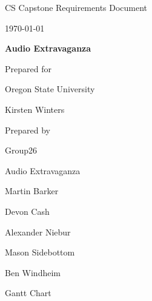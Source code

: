 \documentclass[onecolumn, draftclsnofoot,10pt, compsoc]{IEEEtran}
\def \CapstoneTeamName{Audio Extravaganza}
\def \CapstoneTeamNumber{26}
\def \GroupMemberOne{Martin Barker}
\def \GroupMemberTwo{Devon Cash}
\def \GroupMemberThree{Alexander Niebur}
\def \GroupMemberFour{Mason Sidebottom}
\def \GroupMemberFive{Ben Windheim}
\def \CapstoneProjectName{Audio Extravaganza}
\def \CapstoneSponsorCompany{Oregon State University}
\def \CapstoneSponsorPerson{Kirsten Winters}
\def \DocType{		
				Requirements Document
				}
\newcommand{\NameSigPair}[1]{\par
\makebox[2.75in][r]{#1} \hfil 	\makebox[3.25in]{\makebox[2.25in]{\hrulefill} \hfill		\makebox[.75in]{\hrulefill}}
\par\vspace{-12pt} \textit{\tiny\noindent
\makebox[2.75in]{} \hfil		\makebox[3.25in]{\makebox[2.25in][r]{Signature} \hfill	\makebox[.75in][r]{Date}}}}
\renewcommand{\NameSigPair}[1]{#1}
\begin{document}
\begin{titlepage}
    \begin{singlespace}
        \hfill  
        \par\vspace{.2in}
        \centering
        \scshape{
            \huge CS Capstone \DocType \par
            {\large\today}\par
            \vspace{.5in}
            \textbf{\Huge\CapstoneProjectName}\par
            \vfill
            {\large Prepared for}\par
            \Huge \CapstoneSponsorCompany\par
            \vspace{5pt}
            {\Large\NameSigPair{\CapstoneSponsorPerson}\par}
            {\large Prepared by }\par
            Group\CapstoneTeamNumber\par
            \CapstoneTeamName\par 
            \vspace{5pt}
            {\Large
                \NameSigPair{\GroupMemberOne}\par
                \NameSigPair{\GroupMemberTwo}\par
                \NameSigPair{\GroupMemberThree}\par
                \NameSigPair{\GroupMemberFour}\par
                \NameSigPair{\GroupMemberFive}\par
            }
            \vspace{20pt}
        }

		
    \end{singlespace}
\end{titlepage}
\newpage
{}
\tableofcontents

\clearpage



\clearpage



% 
% 


\newpage
Gantt Chart

\newpage



\end{document}
